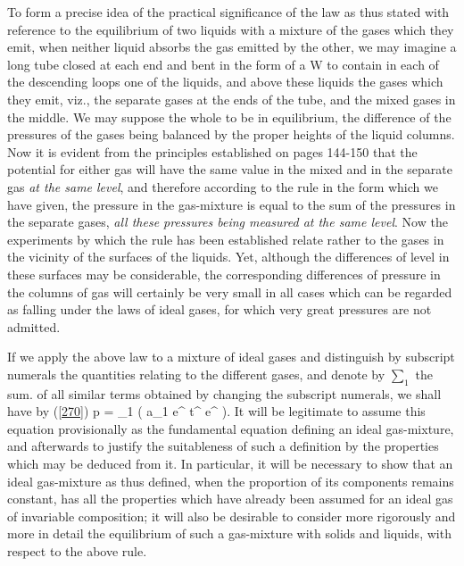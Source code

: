 \documentclass[12pt]{article}
\begin{document}
To form a precise idea of the practical significance of the law as thus stated with reference to the equilibrium of two liquids with a mixture of the gases which they emit, when neither liquid absorbs the gas emitted by the other, we may imagine a long tube closed at each end and bent in the form of a W to contain in each of the descending loops one of the liquids, and above these liquids the gases which they emit, viz., the separate gases at the ends of the tube, and the mixed gases in the middle. We may suppose the whole to be in equilibrium, the difference of the pressures of the gases being balanced by the proper heights of the liquid columns. Now it is evident from the principles established on pages 144-150 that the potential for either gas will have the same value in the mixed and in the separate gas \textit{at the same level}, and therefore according to the rule in the form which we have given, the pressure in the gas-mixture is equal to the sum of the pressures in the separate gases, \textit{all these pressures being measured at the same level}. Now the experiments by which the rule has been established relate rather to the gases in the vicinity of the surfaces of the liquids. Yet, although the differences of level in these surfaces may be considerable, the corresponding differences of pressure in the columns of gas will certainly be very small in all cases which can be regarded as falling under the laws of ideal gases, for which very great pressures are not admitted.


If we apply the above law to a mixture of ideal gases and distinguish by subscript numerals the quantities relating to the different gases, and denote by $\sum_1$ the sum. of all similar terms obtained by changing the subscript numerals, we shall have by (\ref{270})
\eqs p = \sum_1 \left( a_1 e^{} t^{} e^{} \right).  \label{273}\eqe
It will be legitimate to assume this equation provisionally as the fundamental equation defining an ideal gas-mixture, and afterwards to justify the suitableness of such a definition by the properties which may be deduced from it. In particular, it will be necessary to show that an ideal gas-mixture as thus defined, when the proportion of its components remains constant, has all the properties which have already been assumed for an ideal gas of invariable composition; it will also be desirable to consider more rigorously and more in detail the equilibrium of such a gas-mixture with solids and liquids, with respect to the above rule.
\end{document}

